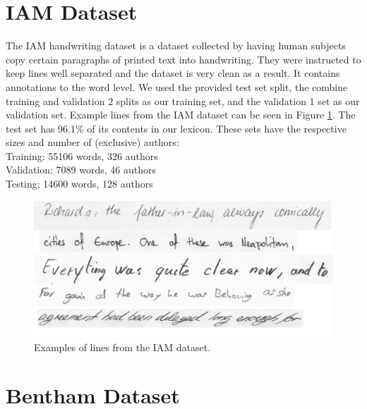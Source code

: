 \documentclass[ms,electronic,twosidetoc,letterpaper,chaptercenter,parttop,lof,lot]{byumsphd}
\begin{document}
\section{IAM Dataset}

The IAM handwriting dataset \cite{IAM} is a dataset collected by having human subjects copy certain paragraphs of printed text into handwriting. They were instructed to keep lines well separated and the dataset is very clean as a result. It contains annotations to the word level. We used the provided test set split, the combine training and validation 2 splits as our training set, and the validation 1 set as our validation set.
Example lines from the IAM dataset can be seen in Figure \ref{fig:IAMExamples}.
The test set has 96.1\% of its contents in our lexicon.
These sets have the respective sizes and number of (exclusive) authors:\\
\indent \indent Training: 55106 words, 326 authors\\
\indent \indent Validation: 7089 words, 46 authors\\
\indent \indent Testing: 14600 words, 128 authors

\begin{figure}
    \centering
    \includegraphics[width=.9\textwidth]{IAM_examples}
    \caption{Examples of lines from the IAM dataset.}
    \label{fig:IAMExamples}
\end{figure}

\section{Bentham Dataset}
\end{document}
